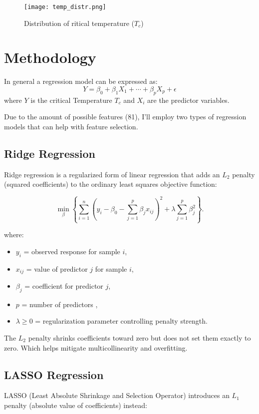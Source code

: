 \documentclass[conference]{IEEEtran}
\begin{document}
\begin{figure}[h]
    \centering
    \texttt{[image: temp\_distr.png]}
    \caption{Distribution of ritical temperature ($T_c$)}
    \label{fig:tc_distribution}
\end{figure}

\section{Methodology}
\noindent In general a regression model can be expressed as:
\[
Y = \beta_0 + \beta_1X_1 + \cdots + \beta_pX_p + \epsilon
\]
where $Y$ is the critical Temperature $T_c$ and $X_i$ are the predictor variables.

Due to the amount of possible features (81), I'll employ two types of regression models that can help with feature selection.
\subsection{Ridge Regression}
Ridge regression is a regularized form of linear regression that adds an $L_2$ penalty (squared coefficients) to the ordinary least squares objective function:

\[
\min_{\beta} \left\{ \sum_{i=1}^{n} \left(y_i - \beta_0 - \sum_{j=1}^{p} \beta_j x_{ij}\right)^2 
+ \lambda \sum_{j=1}^{p} \beta_j^2 \right\}.
\]

where:
\begin{itemize}
    \item $y_i$ = observed response for sample $i$,
    \item $x_{ij}$ = value of predictor $j$ for sample $i$,
    \item $\beta_j$ = coefficient for predictor $j$,
    \item $p$ = number of predictors ,
    \item $\lambda \geq 0$ = regularization parameter controlling penalty strength.
\end{itemize}

The $L_2$ penalty shrinks coefficients toward zero but does not set them exactly to zero. Which helps mitigate multicollinearity and overfitting.


\subsection{LASSO Regression}
LASSO (Least Absolute Shrinkage and Selection Operator) introduces an $L_1$ penalty (absolute value of coefficients) instead:
\end{document}
